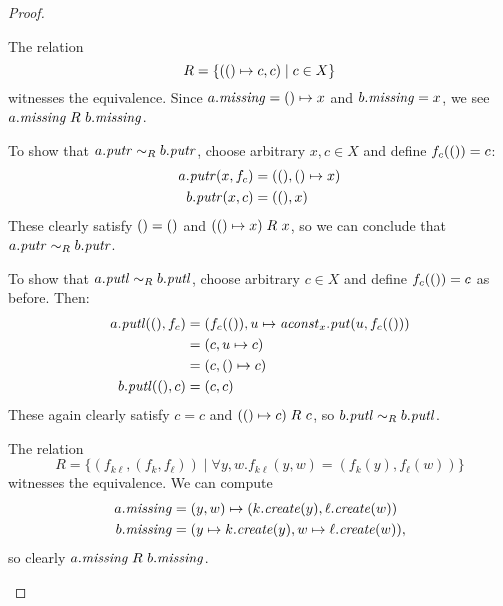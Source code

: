 \begin{defn}[$R$-similarity]
\begin{theorem}
\begin{lemma}
\begin{theorem}[No products]
\begin{lemma}
\begin{defn}
\begin{theorem}
\begin{theorem}
\begin{corollary}[Hylomorphism]
\begin{defn}
\begin{defn}
\begin{defn}[Symmetrization]
\begin{proof}
\begin{longenum}
\item The relation
\[R = \{({()} \mapsto c,c) \mid c \in X\}\]
witnesses the equivalence. Since $a.\mathit{missing} = {()} \mapsto x$ and
$b.\mathit{missing} = x$, we see $a.\mathit{missing} \mathrel{R_{}} b.\mathit{missing}$.

To show that $a.\mathit{putr} \sim_R b.\mathit{putr}$, choose arbitrary $x,c \in X$ and
define $f_c({()})=c$:
\begin{align*}
    a.\mathit{putr}(x,f_c) &= ({()},{()} \mapsto x) \\
    b.\mathit{putr}(x,c) &= ({()},x)
\end{align*}
These clearly satisfy ${()} = {()}$ and $({()} \mapsto x) \mathrel{R_{}} x$, so we
can conclude that $a.\mathit{putr} \sim_R b.\mathit{putr}$.

To show that $a.\mathit{putl} \sim_R b.\mathit{putl}$, choose arbitrary $c \in X$ and define
$f_c({()})=c$ as before. Then:
\begin{align*}
    a.\mathit{putl}({()},f_c) &= (f_c({()}),u \mapsto \mathit{aconst}_x.\mathit{put}(u,f_c({()})) \\
    &= (c,u \mapsto c) \\
    &= (c,{()} \mapsto c) \\
    b.\mathit{putl}({()},c) &= (c,c)
\end{align*}
These again clearly satisfy $c = c$ and $({()} \mapsto c) \mathrel{R_{}} c$, so
$b.\mathit{putl} \sim_R b.\mathit{putl}$.

\item The relation
\[R = \{(f_{k\ell},(f_k,f_\ell)) \mid \forall y,w. f_{k\ell}(y,w)=(f_k(y),f_\ell(w)) \}\]
witnesses the equivalence. We can compute
\begin{align*}
    a.\mathit{missing} &= (y,w) \mapsto (k.\mathit{create}(y),\ell.\mathit{create}(w)) \\
    b.\mathit{missing} &= (y \mapsto k.\mathit{create}(y),w \mapsto \ell.\mathit{create}(w)),
\end{align*}
so clearly $a.\mathit{missing} \mathrel{R_{}} b.\mathit{missing}$.


\end{longenum}
\end{proof}
\end{defn}
\end{defn}
\end{defn}
\end{corollary}
\end{theorem}
\end{theorem}
\end{defn}
\end{lemma}
\end{theorem}
\end{lemma}
\end{theorem}
\end{defn}

